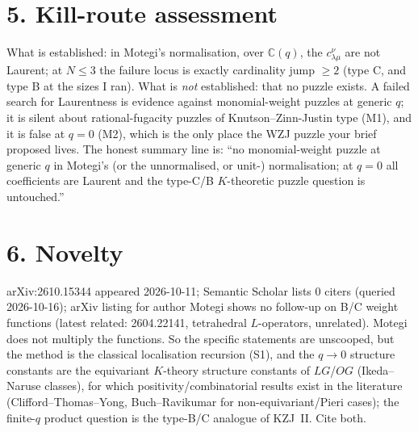 \documentclass[11pt]{article}
\begin{document}
\section*{5. Kill-route assessment}
What is established: in Motegi's normalisation, over $\mathbb C(q)$, the $c^\nu_{\lambda\mu}$ are not Laurent; at $N\le3$ the failure locus is
exactly cardinality jump $\ge2$ (type C, and type B at the sizes I ran). What is \emph{not} established: that no puzzle exists. A failed
search for Laurentness is evidence against monomial-weight puzzles at generic $q$; it is silent about rational-fugacity puzzles of
Knutson--Zinn-Justin type (M1), and it is false at $q=0$ (M2), which is the only place the WZJ puzzle your brief proposed lives.
The honest summary line is: ``no monomial-weight puzzle at generic $q$ in Motegi's (or the unnormalised, or unit-) normalisation;
at $q=0$ all coefficients are Laurent and the type-C/B $K$-theoretic puzzle question is untouched.''

\section*{6. Novelty}
arXiv:2610.15344 appeared 2026-10-11; Semantic Scholar lists 0 citers (queried 2026-10-16); arXiv listing for author Motegi
shows no follow-up on B/C weight functions (latest related: 2604.22141, tetrahedral $L$-operators, unrelated). Motegi does not multiply
the functions. So the specific statements are unscooped, but the method is the classical localisation recursion (S1), and the
$q\to0$ structure constants are the equivariant $K$-theory structure constants of $LG$/$OG$ (Ikeda--Naruse classes), for which
positivity/combinatorial results exist in the literature (Clifford--Thomas--Yong, Buch--Ravikumar for non-equivariant/Pieri cases);
the finite-$q$ product question is the type-B/C analogue of KZJ~II. Cite both.
\end{document}
